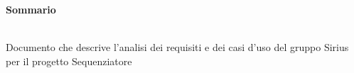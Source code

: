 \noindent\begin{Large}\textbf{Sommario}\end{Large}\\
\noindent
Documento che descrive l’analisi dei requisiti e dei casi d’uso del gruppo Sirius per il progetto Sequenziatore